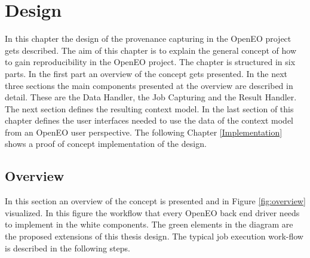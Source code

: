 \documentclass[draft,final]{vutinfth} %
\begin{document}



 
\chapter{Design}\label{Design}
In this chapter the design of the provenance capturing in the OpenEO project gets described. The aim of this chapter is to explain the general concept of how to gain reproducibility in the OpenEO project. The chapter is structured in six parts. In the first part an overview of the concept gets presented. In the next three sections the main components presented at the overview are described in detail. These are the Data Handler, the Job Capturing and the Result Handler. The next section defines the resulting context model. In the last section of this chapter defines the user interfaces needed to use the data of the context model from an OpenEO user perspective. The following Chapter \ref{Implementation} shows a proof of concept implementation of the design. 


\section{Overview}\label{Design:Overview}
In this section an overview of the concept is presented and in Figure \ref{fig:overview} visualized. In this figure the workflow that every OpenEO  back end driver needs to implement in the white components. The green elements in the diagram are the proposed extensions of this thesis design. The typical job execution work-flow is described in the following steps.
\end{document}
